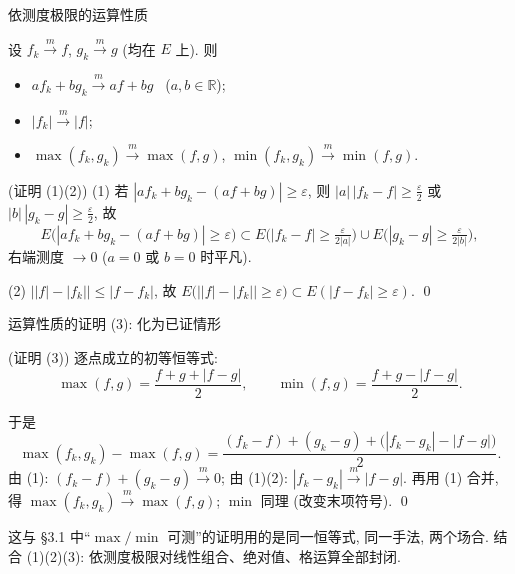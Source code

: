 \begin{frame}{依测度极限的运算性质}

\begin{thm}[运算性质]
设 $f_k \xrightarrow{m} f$, $g_k \xrightarrow{m} g$ (均在 $E$ 上). 则
\begin{itemize}
\item[(1)] $a f_k + b g_k \xrightarrow{m} a f + b g$ \ ($a, b \in \mathbb{R}$);
\item[(2)] $|f_k| \xrightarrow{m} |f|$;
\item[(3)] $\max(f_k, g_k) \xrightarrow{m} \max(f, g)$, \quad $\min(f_k, g_k) \xrightarrow{m} \min(f, g)$.
\end{itemize}
\end{thm}

\pause

\startproof[bg=yellow, fg=red](证明 (1)(2))
(1) 若 $|af_k + bg_k - (af + bg)| \geqslant \varepsilon$, 则 $|a|\,|f_k - f| \geqslant \frac{\varepsilon}{2}$ 或 $|b|\,|g_k - g| \geqslant \frac{\varepsilon}{2}$, 故
\[
E\big(|af_k + bg_k - (af+bg)| \geqslant \varepsilon\big)
\subset E\big(|f_k - f| \geqslant \tfrac{\varepsilon}{2|a|}\big)
\cup E\big(|g_k - g| \geqslant \tfrac{\varepsilon}{2|b|}\big),
\]
右端测度 $\to 0$ ($a = 0$ 或 $b = 0$ 时平凡).

(2) $\big||f| - |f_k|\big| \leqslant |f - f_k|$, 故
$E\big(\big||f| - |f_k|\big| \geqslant \varepsilon\big) \subset E(|f - f_k| \geqslant \varepsilon)$.
\qed

\end{frame}


\begin{frame}{运算性质的证明 (3): 化为已证情形}

\startproof[bg=yellow, fg=red](证明 (3))
逐点成立的初等恒等式:
\[
\max(f, g) = \frac{f + g + |f - g|}{2},
\qquad
\min(f, g) = \frac{f + g - |f - g|}{2}.
\]

\pause

于是
\[
\max(f_k, g_k) - \max(f, g)
= \frac{(f_k - f) + (g_k - g) + \big(|f_k - g_k| - |f - g|\big)}{2}.
\]
由 (1): $(f_k - f) + (g_k - g) \xrightarrow{m} 0$; 由 (1)(2): $|f_k - g_k| \xrightarrow{m} |f - g|$. 再用 (1) 合并, 得
$\max(f_k, g_k) \xrightarrow{m} \max(f, g)$; $\min$ 同理 (改变末项符号).
\qed

\pause

\begin{remark}
这与 \S 3.1 中``$\max/\min$ 可测''的证明用的是\alert{同一恒等式}, 同一手法, 两个场合. 结合 (1)(2)(3): 依测度极限对\alert{线性组合、绝对值、格运算}全部封闭.
\end{remark}

\end{frame}

